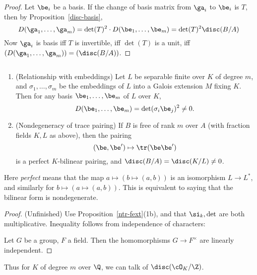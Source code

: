 \begin{proof}
Let $\be_i$ be a basis. 
If the change of basis matrix from $\ga_i$ to $\be_i$ is $T$, then by Proposition~\ref{disc-basis},
\[
D(\ga_1,\ldots, \ga_m)=\det(T)^2\cdot D(\be_1,\ldots, \be_m)
=\det(T)^2\disc(B/A)
\]
Now $\ga_i$ is basis iff $T$ is invertible, iff $\det(T)$ is a unit, iff $(D(\ga_1,\ldots, \ga_m))=(\disc(B/A))$.
\end{proof}
\begin{pr}$\,$
\begin{enumerate}
\item (Relationship with embeddings)
Let $L$ be separable finite over $K$ of degree $m$, and $\sigma_1,\ldots,\sigma_m$ be the embeddings of $L$ into a Galois extension $M$ fixing $K$. Then for any basis $\be_1,\ldots, \be_m$ of $L$ over $K$,
\[
D(\be_1,\ldots, \be_m)=\det(\sigma_i\be_j)^2\neq 0.
\]
\item (Nondegeneracy of trace pairing) If $B$ is free of rank $m$ over $A$ (with fraction fields $K,L$ as above), then the pairing \[(\be,\be')\mapsto \tr(\be\be')\] is a perfect $K$-bilinear pairing, and $\disc(B/A)=\disc(K/L)\neq 0$.
\end{enumerate}
Here {\it perfect} means that the map $a\mapsto (b\mapsto (a,b))$ is an isomorphism $L\to L^*$, and similarly for $b\mapsto (a\mapsto(a,b))$. This is equivalent to saying that the bilinear form is nondegenerate. %
\end{pr}
\begin{proof} (Unfinished) 
Use Proposition~\ref{ntr-fext}(1b), and that $\si_k,\det$ are both multiplicative. Inequality follows from independence of characters:

Let $G$ be a group, $F$ a field. Then the homomorphisms $G\to F^{\times}$ are linearly independent. 
\end{proof}
Thus for $K$ of degree $m$ over $\Q$, we can talk of $\disc(\cO_K/\Z)$.

